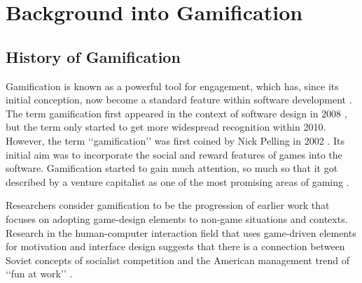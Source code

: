 \chapter{Background into Gamification}
	\label{chap:resources}
		

	\section{History of Gamification}
		
		Gamification is known as a powerful tool for engagement, which has, since its initial conception, now become a standard feature within software development \cite{history}. The term gamification first appeared in the context of software design in 2008 \cite{walz15}, but the term only started to get more widespread recognition within 2010. However, the term ‘‘gamification’’ was first coined by Nick Pelling in 2002 \cite{history}. Its initial aim was to incorporate the social and reward features of games into the software. Gamification started to gain much attention, so much so that it got described by a venture capitalist as one of the most promising areas of gaming \cite{wikigame}.
		
		Researchers consider gamification to be the progression of earlier work that focuses on adopting game-design elements to non-game situations and contexts. Research in the human-computer interaction field that uses game-driven elements for motivation and interface design suggests that there is a connection between Soviet concepts of socialist competition and the American management trend of ‘‘fun at work’’ \cite{wikigame}. 
		
